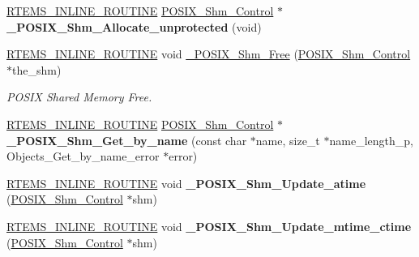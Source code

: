 \begin{DoxyCompactItemize}
\item 
\mbox{\label{group__POSIXShmPrivate_gaf5a00b169b596e8656d984db22200c51}} 
\mbox{\hyperlink{group__RTEMSScoreBaseDefs_gac216239df231d5dbd15e3520b0b9313f}{R\+T\+E\+M\+S\+\_\+\+I\+N\+L\+I\+N\+E\+\_\+\+R\+O\+U\+T\+I\+NE}} \mbox{\hyperlink{structPOSIX__Shm__Control}{P\+O\+S\+I\+X\+\_\+\+Shm\+\_\+\+Control}} $\ast$ {\bfseries \+\_\+\+P\+O\+S\+I\+X\+\_\+\+Shm\+\_\+\+Allocate\+\_\+unprotected} (void)
\item 
\mbox{\hyperlink{group__RTEMSScoreBaseDefs_gac216239df231d5dbd15e3520b0b9313f}{R\+T\+E\+M\+S\+\_\+\+I\+N\+L\+I\+N\+E\+\_\+\+R\+O\+U\+T\+I\+NE}} void \mbox{\hyperlink{group__POSIXShmPrivate_ga6e1dcb58b602cf17eda5f3a3112a31ba}{\+\_\+\+P\+O\+S\+I\+X\+\_\+\+Shm\+\_\+\+Free}} (\mbox{\hyperlink{structPOSIX__Shm__Control}{P\+O\+S\+I\+X\+\_\+\+Shm\+\_\+\+Control}} $\ast$the\+\_\+shm)
\begin{DoxyCompactList}\small\item\em P\+O\+S\+IX Shared Memory Free. \end{DoxyCompactList}\item 
\mbox{\label{group__POSIXShmPrivate_ga266d01a864eefc0b09ab15154cba7cff}} 
\mbox{\hyperlink{group__RTEMSScoreBaseDefs_gac216239df231d5dbd15e3520b0b9313f}{R\+T\+E\+M\+S\+\_\+\+I\+N\+L\+I\+N\+E\+\_\+\+R\+O\+U\+T\+I\+NE}} \mbox{\hyperlink{structPOSIX__Shm__Control}{P\+O\+S\+I\+X\+\_\+\+Shm\+\_\+\+Control}} $\ast$ {\bfseries \+\_\+\+P\+O\+S\+I\+X\+\_\+\+Shm\+\_\+\+Get\+\_\+by\+\_\+name} (const char $\ast$name, size\+\_\+t $\ast$name\+\_\+length\+\_\+p, Objects\+\_\+\+Get\+\_\+by\+\_\+name\+\_\+error $\ast$error)
\item 
\mbox{\label{group__POSIXShmPrivate_ga57ded5a2dfa4285fca9156a5692d1327}} 
\mbox{\hyperlink{group__RTEMSScoreBaseDefs_gac216239df231d5dbd15e3520b0b9313f}{R\+T\+E\+M\+S\+\_\+\+I\+N\+L\+I\+N\+E\+\_\+\+R\+O\+U\+T\+I\+NE}} void {\bfseries \+\_\+\+P\+O\+S\+I\+X\+\_\+\+Shm\+\_\+\+Update\+\_\+atime} (\mbox{\hyperlink{structPOSIX__Shm__Control}{P\+O\+S\+I\+X\+\_\+\+Shm\+\_\+\+Control}} $\ast$shm)
\item 
\mbox{\label{group__POSIXShmPrivate_gac0328a83e431c0309c575abbc0323dae}} 
\mbox{\hyperlink{group__RTEMSScoreBaseDefs_gac216239df231d5dbd15e3520b0b9313f}{R\+T\+E\+M\+S\+\_\+\+I\+N\+L\+I\+N\+E\+\_\+\+R\+O\+U\+T\+I\+NE}} void {\bfseries \+\_\+\+P\+O\+S\+I\+X\+\_\+\+Shm\+\_\+\+Update\+\_\+mtime\+\_\+ctime} (\mbox{\hyperlink{structPOSIX__Shm__Control}{P\+O\+S\+I\+X\+\_\+\+Shm\+\_\+\+Control}} $\ast$shm)
\end{DoxyCompactItemize}


